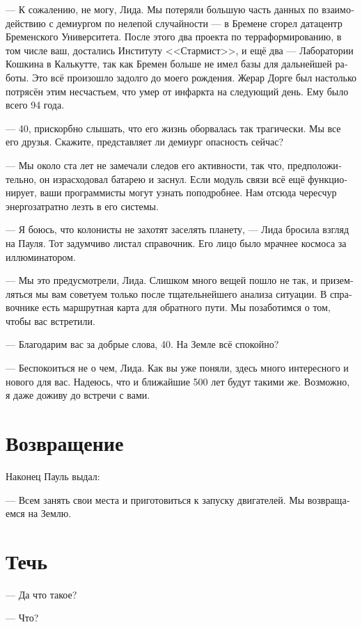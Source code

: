 \documentclass[a4paper,12pt,fleqn]{book}\usepackage{cooltooltips}\usepackage{polyglossia}\setdefaultlanguage[babelshorthands=true]{russian}\setotherlanguage{english}\defaultfontfeatures{Ligatures=TeX,Mapping=tex-text} \usepackage{xcolor}\definecolor{lightgray}{HTML}{bbbbbb}\color{lightgray}\newcommand{\ml}[3]{\textenglish{\textcolor{black}{#3}}}
\begin{document}
--- К сожалению, не могу, Лида.
Мы потеряли большую часть данных по взаимодействию с демиургом по нелепой случайности --- в Бремене сгорел датацентр Бременского Университета.
После этого два проекта по терраформированию, в том числе ваш, достались Институту <<Стармист>>, и ещё два --- Лаборатории Кошкина в Калькутте, так как Бремен больше не имел базы для дальнейшей работы.
Это всё произошло задолго до моего рождения.
Жерар Дорге был настолько потрясён этим несчастьем, что умер от инфаркта на следующий день.
Ему было всего 94 года.

--- 40, прискорбно слышать, что его жизнь оборвалась так трагически.
Мы все его друзья.
Скажите, представляет ли демиург опасность сейчас?

--- Мы около ста лет не замечали следов его активности, так что, предположительно, он израсходовал батарею и заснул.
Если модуль связи всё ещё функционирует, ваши программисты могут узнать поподробнее.
Нам отсюда чересчур энергозатратно лезть в его системы.

--- Я боюсь, что колонисты не захотят заселять планету, --- Лида бросила взгляд на Пауля.
Тот задумчиво листал справочник.
Его лицо было мрачнее космоса за иллюминатором.

--- Мы это предусмотрели, Лида.
Слишком много вещей пошло не так, и приземляться мы вам советуем только после тщательнейшего анализа ситуации.
В справочнике есть маршрутная карта для обратного пути.
Мы позаботимся о том, чтобы вас встретили.

--- Благодарим вас за добрые слова, 40.
На Земле всё спокойно?

--- Беспокоиться не о чем, Лида.
Как вы уже поняли, здесь много интересного и нового для вас.
Надеюсь, что и ближайшие 500 лет будут такими же.
Возможно, я даже доживу до встречи с вами.

\section{Возвращение}

Наконец Пауль выдал:

--- Всем занять свои места и приготовиться к запуску двигателей.
Мы возвращаемся на Землю.

\section{Течь}

--- Да что такое?

--- Что?
\end{document}
